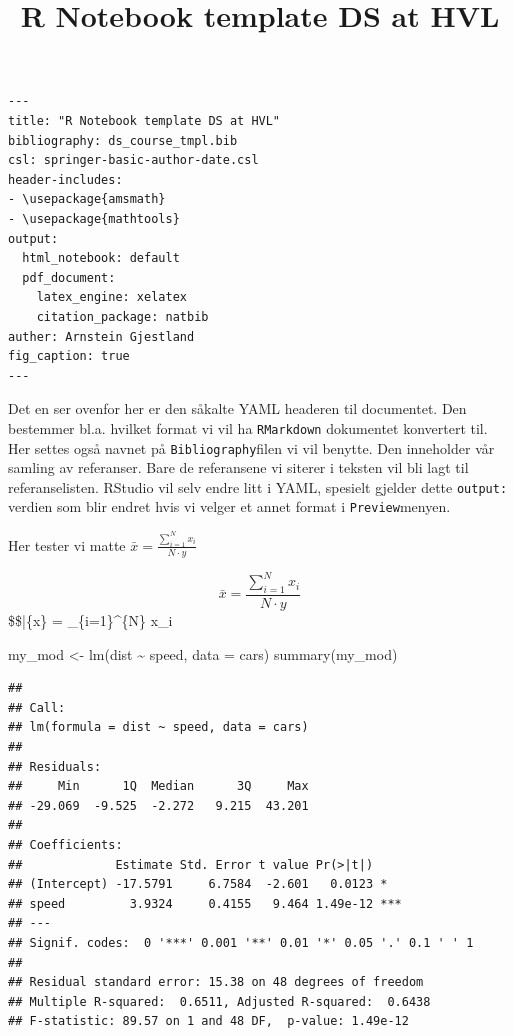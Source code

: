 \documentclass[
]{article}
\title{R Notebook template DS at HVL}
\author{}
\date{\vspace{-2.5em}}
\newenvironment{Shaded}{\begin{snugshade}}{\end{snugshade}}
\newcommand{\AttributeTok}[1]{\textcolor[rgb]{0.77,0.63,0.00}{#1}}
\newcommand{\FunctionTok}[1]{\textcolor[rgb]{0.00,0.00,0.00}{#1}}
\newcommand{\NormalTok}[1]{#1}
\newcommand{\OtherTok}[1]{\textcolor[rgb]{0.56,0.35,0.01}{#1}}
\newcommand{\SpecialCharTok}[1]{\textcolor[rgb]{0.00,0.00,0.00}{#1}}
\begin{document}
\maketitle

\begin{verbatim}
---
title: "R Notebook template DS at HVL"
bibliography: ds_course_tmpl.bib
csl: springer-basic-author-date.csl
header-includes:
- \usepackage{amsmath}
- \usepackage{mathtools}
output:
  html_notebook: default
  pdf_document:
    latex_engine: xelatex
    citation_package: natbib
auther: Arnstein Gjestland
fig_caption: true
---
\end{verbatim}

Det en ser ovenfor her er den såkalte YAML headeren til documentet. Den
bestemmer bl.a. hvilket format vi vil ha \texttt{RMarkdown} dokumentet
konvertert til. Her settes også navnet på \texttt{Bibliography}filen vi
vil benytte. Den inneholder vår samling av referanser. Bare de
referansene vi siterer i teksten vil bli lagt til referanselisten.
RStudio vil selv endre litt i YAML, spesielt gjelder dette
\texttt{output:} verdien som blir endret hvis vi velger et annet format
i \texttt{Preview}menyen.

Her tester vi matte \(\bar{x} = \frac{\sum_{i=1}^{N} x_i}{N \cdot y}\)

\[\bar{x} = \frac{\sum_{i=1}^{N} x_i}{N \cdot y}\] \$\$\bar\{x\} =
 \sum\_\{i=1\}\^{}\{N\} x\_i

\begin{Shaded}
\begin{Highlighting}[]
\NormalTok{my\_mod }\OtherTok{\textless{}{-}} \FunctionTok{lm}\NormalTok{(dist }\SpecialCharTok{\textasciitilde{}}\NormalTok{ speed, }\AttributeTok{data =}\NormalTok{ cars)}
\FunctionTok{summary}\NormalTok{(my\_mod)}
\end{Highlighting}
\end{Shaded}

\begin{verbatim}
## 
## Call:
## lm(formula = dist ~ speed, data = cars)
## 
## Residuals:
##     Min      1Q  Median      3Q     Max 
## -29.069  -9.525  -2.272   9.215  43.201 
## 
## Coefficients:
##             Estimate Std. Error t value Pr(>|t|)    
## (Intercept) -17.5791     6.7584  -2.601   0.0123 *  
## speed         3.9324     0.4155   9.464 1.49e-12 ***
## ---
## Signif. codes:  0 '***' 0.001 '**' 0.01 '*' 0.05 '.' 0.1 ' ' 1
## 
## Residual standard error: 15.38 on 48 degrees of freedom
## Multiple R-squared:  0.6511, Adjusted R-squared:  0.6438 
## F-statistic: 89.57 on 1 and 48 DF,  p-value: 1.49e-12
\end{verbatim}
\end{document}
